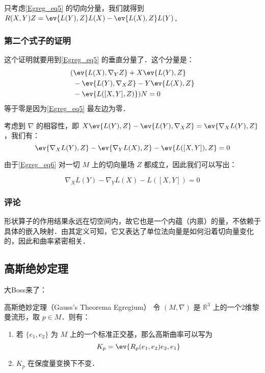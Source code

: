 只考虑\autoref{Egreg_eq5} 的切向分量，我们就得到 $R(X, Y)Z=\ev{L(Y), Z}L(X)-\ev{L(X), Z}L(Y)$．








\subsubsection{第二个式子的证明}

这个证明就要用到\autoref{Egreg_eq5} 的垂直分量了．这个分量是：
\begin{equation}
\begin{aligned}
(&\ev{L(X), \nabla_YZ}+X\ev{L(Y), Z}\\&-\ev{L(Y), \nabla_XZ}-Y\ev{L(X), Z}\\&-\ev{L([X, Y], Z)})N=0
\end{aligned}
\end{equation}
等于零是因为\autoref{Egreg_eq5} 最左边为零．

考虑到 $\nabla$ 的相容性，即 $X\ev{L(Y), Z}-\ev{L(Y), \nabla_XZ}=\ev{\nabla_XL(Y), Z}$，我们有：
\begin{equation}\label{Egreg_eq6}
\ev{\nabla_XL(Y), Z}-\ev{\nabla_YL(X), Z}-\ev{L([X, Y]), Z}=0
\end{equation}

由于\autoref{Egreg_eq6} 对一切 $M$ 上的切向量场 $Z$ 都成立，因此我们可以写出：

\begin{equation}
\nabla_XL(Y)-\nabla_YL(X)-L([X, Y])=0
\end{equation}

\subsubsection{评论}

形状算子的作用结果永远在切空间内，故它也是一个内蕴（内禀）的量，不依赖于具体的嵌入映射．由其定义可知，它又表达了单位法向量是如何沿着切向量变化的，因此和曲率紧密相关．





\subsection{高斯绝妙定理}

大Boss来了：

\begin{theorem}{高斯绝妙定理（Gauss's Theorema Egregium）}
令 $(M, \nabla)$ 是 $\mathbb{R}^3$ 上的一个2维黎曼流形，取 $p\in M$．则有：
\begin{enumerate}
\item 若 $\{e_1, e_2\}$ 为 $M$ 上的一个标准正交基，那么高斯曲率可以写为
\begin{equation}
K_p=\ev{R_p(e_1, e_2)e_2, e_1}
\end{equation}
\item $K_p$ 在保度量变换下不变．
\end{enumerate}

\end{theorem}

